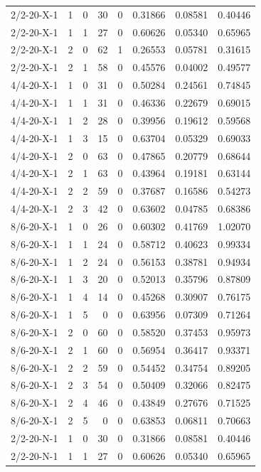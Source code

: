 \begin{longtable}{lrrrrrrr}
2/2-20-X-1 & 1 & 0 & 30 & 0 & 0.31866 & 0.08581 & 0.40446 \\
2/2-20-X-1 & 1 & 1 & 27 & 0 & 0.60626 & 0.05340 & 0.65965 \\
2/2-20-X-1 & 2 & 0 & 62 & 1 & 0.26553 & 0.05781 & 0.31615 \\
2/2-20-X-1 & 2 & 1 & 58 & 0 & 0.45576 & 0.04002 & 0.49577 \\
4/4-20-X-1 & 1 & 0 & 31 & 0 & 0.50284 & 0.24561 & 0.74845 \\
4/4-20-X-1 & 1 & 1 & 31 & 0 & 0.46336 & 0.22679 & 0.69015 \\
4/4-20-X-1 & 1 & 2 & 28 & 0 & 0.39956 & 0.19612 & 0.59568 \\
4/4-20-X-1 & 1 & 3 & 15 & 0 & 0.63704 & 0.05329 & 0.69033 \\
4/4-20-X-1 & 2 & 0 & 63 & 0 & 0.47865 & 0.20779 & 0.68644 \\
4/4-20-X-1 & 2 & 1 & 63 & 0 & 0.43964 & 0.19181 & 0.63144 \\
4/4-20-X-1 & 2 & 2 & 59 & 0 & 0.37687 & 0.16586 & 0.54273 \\
4/4-20-X-1 & 2 & 3 & 42 & 0 & 0.63602 & 0.04785 & 0.68386 \\
8/6-20-X-1 & 1 & 0 & 26 & 0 & 0.60302 & 0.41769 & 1.02070 \\
8/6-20-X-1 & 1 & 1 & 24 & 0 & 0.58712 & 0.40623 & 0.99334 \\
8/6-20-X-1 & 1 & 2 & 24 & 0 & 0.56153 & 0.38781 & 0.94934 \\
8/6-20-X-1 & 1 & 3 & 20 & 0 & 0.52013 & 0.35796 & 0.87809 \\
8/6-20-X-1 & 1 & 4 & 14 & 0 & 0.45268 & 0.30907 & 0.76175 \\
8/6-20-X-1 & 1 & 5 & 0 & 0 & 0.63956 & 0.07309 & 0.71264 \\
8/6-20-X-1 & 2 & 0 & 60 & 0 & 0.58520 & 0.37453 & 0.95973 \\
8/6-20-X-1 & 2 & 1 & 60 & 0 & 0.56954 & 0.36417 & 0.93371 \\
8/6-20-X-1 & 2 & 2 & 59 & 0 & 0.54452 & 0.34754 & 0.89205 \\
8/6-20-X-1 & 2 & 3 & 54 & 0 & 0.50409 & 0.32066 & 0.82475 \\
8/6-20-X-1 & 2 & 4 & 46 & 0 & 0.43849 & 0.27676 & 0.71525 \\
8/6-20-X-1 & 2 & 5 & 0 & 0 & 0.63853 & 0.06811 & 0.70663 \\
2/2-20-N-1 & 1 & 0 & 30 & 0 & 0.31866 & 0.08581 & 0.40446 \\
2/2-20-N-1 & 1 & 1 & 27 & 0 & 0.60626 & 0.05340 & 0.65965 \\

\end{longtable}
